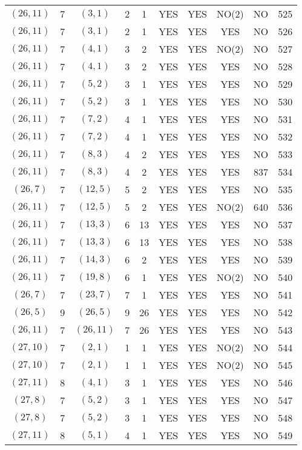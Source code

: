 \begin{longtable}{|c|c|c|c|c|c|c|c|c|c|}
$(26, 11)$ & 7 & $(3, 1)$ & 2 & 1 & YES & YES & NO(2) & NO & 525\\
$(26, 11)$ & 7 & $(3, 1)$ & 2 & 1 & YES & YES & YES & NO & 526\\
$(26, 11)$ & 7 & $(4, 1)$ & 3 & 2 & YES & YES & NO(2) & NO & 527\\
$(26, 11)$ & 7 & $(4, 1)$ & 3 & 2 & YES & YES & YES & NO & 528\\
$(26, 11)$ & 7 & $(5, 2)$ & 3 & 1 & YES & YES & YES & NO & 529\\
$(26, 11)$ & 7 & $(5, 2)$ & 3 & 1 & YES & YES & YES & NO & 530\\
$(26, 11)$ & 7 & $(7, 2)$ & 4 & 1 & YES & YES & YES & NO & 531\\
$(26, 11)$ & 7 & $(7, 2)$ & 4 & 1 & YES & YES & YES & NO & 532\\
$(26, 11)$ & 7 & $(8, 3)$ & 4 & 2 & YES & YES & YES & NO & 533\\
$(26, 11)$ & 7 & $(8, 3)$ & 4 & 2 & YES & YES & YES & 837 & 534\\
$(26, 7)$ & 7 & $(12, 5)$ & 5 & 2 & YES & YES & YES & NO & 535\\
$(26, 11)$ & 7 & $(12, 5)$ & 5 & 2 & YES & YES & NO(2) & 640 & 536\\
$(26, 11)$ & 7 & $(13, 3)$ & 6 & 13 & YES & YES & YES & NO & 537\\
$(26, 11)$ & 7 & $(13, 3)$ & 6 & 13 & YES & YES & YES & NO & 538\\
$(26, 11)$ & 7 & $(14, 3)$ & 6 & 2 & YES & YES & YES & NO & 539\\
$(26, 11)$ & 7 & $(19, 8)$ & 6 & 1 & YES & YES & NO(2) & NO & 540\\
$(26, 7)$ & 7 & $(23, 7)$ & 7 & 1 & YES & YES & YES & NO & 541\\
$(26, 5)$ & 9 & $(26, 5)$ & 9 & 26 & YES & YES & YES & NO & 542\\
$(26, 11)$ & 7 & $(26, 11)$ & 7 & 26 & YES & YES & YES & NO & 543\\
$(27, 10)$ & 7 & $(2, 1)$ & 1 & 1 & YES & YES & NO(2) & NO & 544\\
$(27, 10)$ & 7 & $(2, 1)$ & 1 & 1 & YES & YES & NO(2) & NO & 545\\
$(27, 11)$ & 8 & $(4, 1)$ & 3 & 1 & YES & YES & YES & NO & 546\\
$(27, 8)$ & 7 & $(5, 2)$ & 3 & 1 & YES & YES & YES & NO & 547\\
$(27, 8)$ & 7 & $(5, 2)$ & 3 & 1 & YES & YES & YES & NO & 548\\
$(27, 11)$ & 8 & $(5, 1)$ & 4 & 1 & YES & YES & YES & NO & 549\\

\end{longtable}
